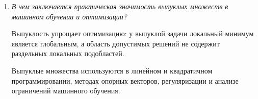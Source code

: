 \begin{enumerate}
    \item
    \textit{В чем заключается практическая значимость выпуклых множеств
    в машинном обучении и оптимизации?}

    Выпуклость упрощает оптимизацию: у выпуклой задачи локальный минимум
    является глобальным, а область допустимых решений не содержит
    раздельных локальных подобластей.

    Выпуклые множества используются в линейном и квадратичном
    программировании, методах опорных векторов, регуляризации и анализе
    ограничений машинного обучения.
\end{enumerate}
